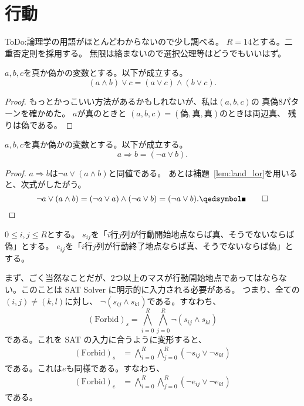 
\section{行動}

ToDo:論理学の用語がほとんどわからないので少し調べる。
$R = 14$とする。二重否定則を採用する。
無限は絡まないので選択公理等はどうでもいいはず。

\begin{lem} \label{lem:land_lor}
 $a, b, c$を真か偽かの変数とする。以下が成立する。
 \[
 (a \land b) \lor c = (a \lor c) \land (b \lor c).
 \]
\end{lem}

\begin{proof}
 もっとかっこいい方法があるかもしれないが、私は$(a, b, c)$の
 真偽$8$パターンを確かめた。
 $a$が真のときと
 $(a, b, c) = (\text{偽}, \text{真}, \text{真})$のときは両辺真、
 残りは偽である。\qedhere
\end{proof}

\begin{cor} \label{cor:rightarrow}
 $a, b, c$を真か偽かの変数とする。以下が成立する。
 \[
  a \Rightarrow b = (\lnot a \lor b).
 \]
\end{cor}

\begin{proof}
 $a \Rightarrow b$は$\lnot a \lor (a \land b)$と同値である。
 あとは補題~\ref{lem:land_lor}を用いると、次式がしたがう。
 \[
  \lnot a \lor (a \land b) = (\lnot a \lor a) \land (\lnot a \lor b)
 = (\lnot a \lor b). \qedhere
 \]
\end{proof}

\begin{nota}
 $0 \leq i, j \leq R$とする。
 $s_{ij}$を「$i$行$j$列が行動開始地点ならば真、そうでないならば偽」とする。
 $e_{ij}$を「$i$行$j$列が行動終了地点ならば真、そうでないならば偽」とする。
\end{nota}

まず、ごく当然なことだが、$2$つ以上のマスが行動開始地点であってはならな
い。このことは SAT Solver に明示的に入力される必要がある。
つまり、全ての$(i, j) \neq (k, l)$に対し、
$\lnot (s_{ij} \land s_{kl})$である。すなわち、
\[
 (\text{Forbid})_s = \bigwedge_{i = 0}^R \bigwedge_{j = 0}^R \lnot
 (s_{ij} \land s_{kl})
\]
である。これを SAT の入力に合うように変形すると、
\begin{align*}
 (\text{Forbid})_s &= \bigwedge_{i = 0}^R \bigwedge_{j = 0}^R (\lnot
 s_{ij} \lor \lnot s_{kl}) 
\end{align*}
である。これは$e$も同様である。すなわち、
\begin{align*}
 (\text{Forbid})_e &= \bigwedge_{i = 0}^R \bigwedge_{j = 0}^R (\lnot
 e_{ij} \lor \lnot e_{kl}) 
\end{align*}
である。

